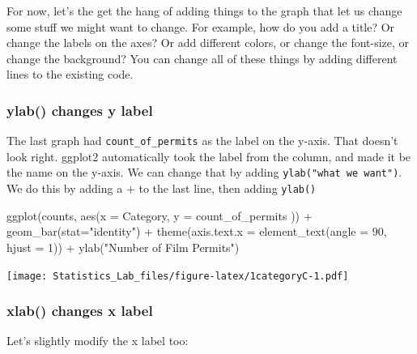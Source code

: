 \documentclass[
]{book}
\newenvironment{Shaded}{\begin{snugshade}}{\end{snugshade}}
\newcommand{\AttributeTok}[1]{\textcolor[rgb]{0.77,0.63,0.00}{#1}}
\newcommand{\DecValTok}[1]{\textcolor[rgb]{0.00,0.00,0.81}{#1}}
\newcommand{\FunctionTok}[1]{\textcolor[rgb]{0.00,0.00,0.00}{#1}}
\newcommand{\NormalTok}[1]{#1}
\newcommand{\SpecialCharTok}[1]{\textcolor[rgb]{0.00,0.00,0.00}{#1}}
\newcommand{\StringTok}[1]{\textcolor[rgb]{0.31,0.60,0.02}{#1}}
\begin{document}
For now, let's the get the hang of adding things to the graph that let us change some stuff we might want to change. For example, how do you add a title? Or change the labels on the axes? Or add different colors, or change the font-size, or change the background? You can change all of these things by adding different lines to the existing code.

\hypertarget{ylab-changes-y-label}{%
\subsubsection{ylab() changes y label}\label{ylab-changes-y-label}}

The last graph had \texttt{count\_of\_permits} as the label on the y-axis. That doesn't look right. ggplot2 automatically took the label from the column, and made it be the name on the y-axis. We can change that by adding \texttt{ylab("what\ we\ want")}. We do this by adding a \(+\) to the last line, then adding \texttt{ylab()}

\begin{Shaded}
\begin{Highlighting}[]
\FunctionTok{ggplot}\NormalTok{(counts, }\FunctionTok{aes}\NormalTok{(}\AttributeTok{x =}\NormalTok{ Category, }\AttributeTok{y =}\NormalTok{ count\_of\_permits )) }\SpecialCharTok{+}
  \FunctionTok{geom\_bar}\NormalTok{(}\AttributeTok{stat=}\StringTok{"identity"}\NormalTok{) }\SpecialCharTok{+} 
  \FunctionTok{theme}\NormalTok{(}\AttributeTok{axis.text.x =} \FunctionTok{element\_text}\NormalTok{(}\AttributeTok{angle =} \DecValTok{90}\NormalTok{, }\AttributeTok{hjust =} \DecValTok{1}\NormalTok{)) }\SpecialCharTok{+}
  \FunctionTok{ylab}\NormalTok{(}\StringTok{"Number of Film Permits"}\NormalTok{)}
\end{Highlighting}
\end{Shaded}

\texttt{[image: Statistics\_Lab\_files/figure-latex/1categoryC-1.pdf]}

\hypertarget{xlab-changes-x-label}{%
\subsubsection{xlab() changes x label}\label{xlab-changes-x-label}}

Let's slightly modify the x label too:
\end{document}
